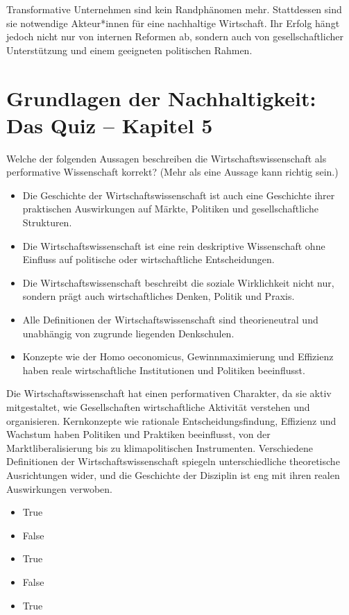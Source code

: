 \documentclass[
  nswissgerman,
  a4paper,
  openany]{book}
\providecommand{\tightlist}{%
  \setlength{\itemsep}{0pt}\setlength{\parskip}{0pt}}
\begin{document}
Transformative Unternehmen sind kein Randphänomen mehr. Stattdessen sind
sie notwendige Akteur*innen für eine nachhaltige Wirtschaft. Ihr Erfolg
hängt jedoch nicht nur von internen Reformen ab, sondern auch von
gesellschaftlicher Unterstützung und einem geeigneten politischen
Rahmen.

\section{Grundlagen der Nachhaltigkeit: Das Quiz -- Kapitel
5}\label{grundlagen-der-nachhaltigkeit-das-quiz-kapitel-5}

Welche der folgenden Aussagen beschreiben die Wirtschaftswissenschaft
als performative Wissenschaft korrekt? (Mehr als eine Aussage kann
richtig sein.)

\begin{itemize}
\tightlist
\item[$\square$]
  Die Geschichte der Wirtschaftswissenschaft ist auch eine Geschichte
  ihrer praktischen Auswirkungen auf Märkte, Politiken und
  gesellschaftliche Strukturen.
\item[$\square$]
  Die Wirtschaftswissenschaft ist eine rein deskriptive Wissenschaft
  ohne Einfluss auf politische oder wirtschaftliche Entscheidungen.
\item[$\square$]
  Die Wirtschaftswissenschaft beschreibt die soziale Wirklichkeit nicht
  nur, sondern prägt auch wirtschaftliches Denken, Politik und Praxis.
\item[$\square$]
  Alle Definitionen der Wirtschaftswissenschaft sind theorieneutral und
  unabhängig von zugrunde liegenden Denkschulen.
\item[$\square$]
  Konzepte wie der Homo oeconomicus, Gewinnmaximierung und Effizienz
  haben reale wirtschaftliche Institutionen und Politiken beeinflusst.
\end{itemize}

Die Wirtschaftswissenschaft hat einen performativen Charakter, da sie
aktiv mitgestaltet, wie Gesellschaften wirtschaftliche Aktivität
verstehen und organisieren. Kernkonzepte wie rationale
Entscheidungsfindung, Effizienz und Wachstum haben Politiken und
Praktiken beeinflusst, von der Marktliberalisierung bis zu
klimapolitischen Instrumenten. Verschiedene Definitionen der
Wirtschaftswissenschaft spiegeln unterschiedliche theoretische
Ausrichtungen wider, und die Geschichte der Disziplin ist eng mit ihren
realen Auswirkungen verwoben.

\begin{itemize}
\tightlist
\item
  True
\item
  False
\item
  True
\item
  False
\item
  True
\end{itemize}
\end{document}
